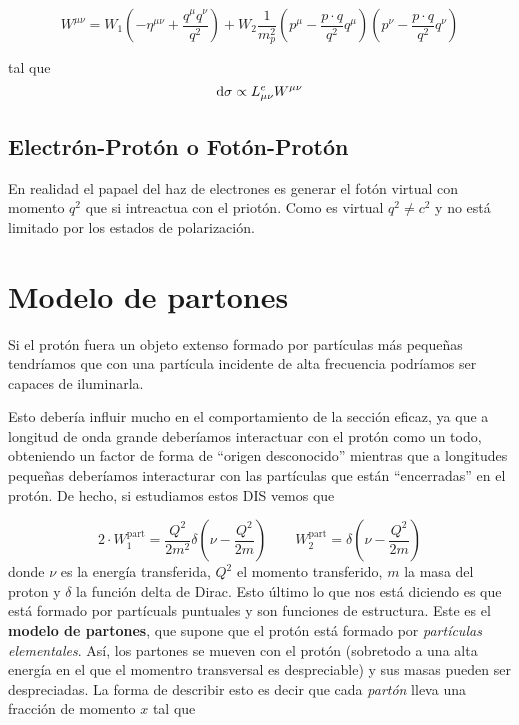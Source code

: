 \begin{equation}
	W^{\mu\nu} = W_1 \left( -\eta^{\mu\nu} + \frac{q^\mu q^\nu}{q^2} \right)
	+ W_2 \frac{1}{m_p^2} \left( p^\mu - \frac{p \cdot q}{q^2} q^\mu \right)
	\left( p^\nu - \frac{p \cdot q}{q^2} q^\nu \right)
\end{equation}


tal que
\begin{equation}
	\mathrm{d} \sigma \propto L_{\mu \nu}^e  W^{\mu \nu}
\end{equation}

\subsection{Electrón-Protón o Fotón-Protón}

En realidad el papael del haz de electrones es generar el fotón virtual con momento $q^2$ que si intreactua con el priotón. Como es virtual $q^2 \neq c^2$ y no está limitado por los estados de polarización.


\section{Modelo de partones}

Si el protón fuera un objeto extenso formado por partículas más pequeñas tendríamos que con una partícula incidente de alta frecuencia podríamos ser capaces de iluminarla.

Esto debería influir mucho en el comportamiento de  la sección eficaz, ya que a longitud de onda grande deberíamos interactuar con el protón como un todo, obteniendo un factor de forma de ``origen desconocido'' mientras que a longitudes pequeñas deberíamos interacturar con las partículas que están ``encerradas'' en el protón. De hecho, si estudiamos estos DIS vemos que

\begin{equation}
	2 \cdot W_1^{\text{part}} = \frac{Q^2}{2m^2} \delta\left( \nu - \frac{Q^2}{2m} \right) 	\qquad 	W_2^{\text{part}} = \delta\left( \nu - \frac{Q^2}{2m} \right)
\end{equation}
donde $\nu$ es la energía transferida, $Q^2$ el momento transferido, $m$ la masa del proton y $\delta$ la función delta de Dirac. Esto último lo que nos está diciendo es que está formado por partícuals puntuales y son funciones de estructura. Este es el \textbf{modelo de partones}, que supone que el protón está formado por \textit{partículas elementales}. Así, los partones se mueven con el protón (sobretodo a una alta energía en el que el momentro transversal es despreciable) y sus masas pueden ser despreciadas. La forma de describir esto es decir que cada \textit{partón} lleva una fracción de momento $x$ tal que

